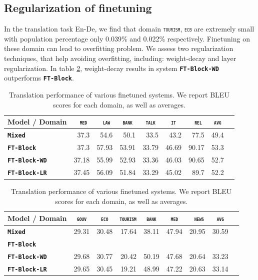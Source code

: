 \documentclass[11pt,a4paper]{article}
\newcommand{\domain}[1]{\texttt{\textsc{#1}}}
\newcommand{\system}[1]{\texttt{\textbf{#1}}}
\begin{document}
\subsection{Regularization of finetuning}
In the translation task En-De, we find that domain \domain{tourism}, \domain{ecb} are extremely small with population percentage only 0.039\% and 0.022\% respectively. Finetuning on these domain can lead to overfitting problem. We assess two regularization techniques, that help avoiding overfitting, including: weight-decay and layer regularization. In table \ref{tab:performance-en-de-reg}, weight-decay results in system \system{FT-Block-WD} outperforms \system{FT-Block}. 
\begin{table}[htbp]
  \centering
  \begin{tabular}{|p{3cm}|*{8}{r|}} \hline
    Model / Domain & \multicolumn{1}{c|}{\domain{ med}} & \multicolumn{1}{c|}{\domain{ law}} & \multicolumn{1}{c|}{\domain{bank}} & \multicolumn{1}{c|}{\domain{talk}} & \multicolumn{1}{c|}{\domain{ it }} & \multicolumn{1}{c|}{\domain{ rel}} & \multicolumn{1}{c|}{\domain{avg}} \\ \hline %
    \system{Mixed}  & 37.3 & 54.6 & 50.1 & 33.5 & 43.2 & 77.5  & 49.4 \\
   \system{FT-Block}     & 37.3	& 57.93 &	53.91 &	33.79 &	46.69 &	90.17 & 53.3 \\ 
   \system{FT-Block-WD}     & 37.18 & 55.99 & 52.93 & 33.36 & 46.03 & 90.65 & 52.7 \\
   \system{FT-Block-LR}     & 37.45 & 56.09 & 51.84 & 33.29 & 45.02 & 89.7 & 52.2 \\
     \hline
  \end{tabular}
  \caption{Translation performance of various finetuned systems. We report BLEU scores for each domain, as well as averages.}
  \label{tab:performance-en-fr-reg}
\end{table}

\begin{table}[htbp]
  \centering
  \begin{tabular}{|p{3cm}|*{8}{r|}} \hline
    Model / Domain & \multicolumn{1}{c|}{\domain{gouv}} & \multicolumn{1}{c|}{\domain{eco}} & \multicolumn{1}{c|}{\domain{tourism}} & \multicolumn{1}{c|}{\domain{bank}} & \multicolumn{1}{c|}{\domain{ med }} & \multicolumn{1}{c|}{\domain{ news}} & \multicolumn{1}{c|}{\domain{avg}} \\ \hline %
    \system{Mixed}  & 29.31 & 30.48 & 17.64 & 38.11 & 47.94 & 20.95  & 30.59 \\
   \system{FT-Block}      \\
   \system{FT-Block-WD}     & 29.68 & 30.77 & 20.42 & 50.19 & 47.68 & 20.64 & 33.23 \\
   \system{FT-Block-LR}     & 29.65 & 30.45 & 19.21 & 48.99 & 47.22 & 20.63 & 33.14 \\ 
     \hline
  \end{tabular}
  \caption{Translation performance of various finetuned systems. We report BLEU scores for each domain, as well as averages.}
  \label{tab:performance-en-de-reg}
\end{table}
\end{document}
